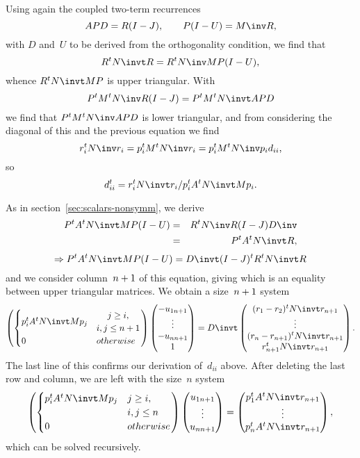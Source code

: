\documentclass[11pt]{artikel3}
\begin{document}
\begin{Outline}
Using again the coupled two-term recurrences 
\[ APD=R(I-J),\qquad P(I-U)=M\inv R,\]
with $D$ and~$U$ to be derived from the orthogonality condition,
we find that
\[ R^tN\invt R=R^tN\inv MP(I-U), \]
whence $R^tN\invt MP$ is upper triangular.
With
\[ P^tM^tN\inv R(I-J)=P^tM^tN\invt APD \]
we find that $P^tM^tN\inv APD$ is lower triangular,
and from considering the diagonal of this and the previous equation we find
\[ r_i^tN\inv r_i=p_i^tM^tN\inv r_i=p_i^tM^tN\inv p_id_{ii}, \]
so \[ d_{ii}^t=r_i^tN\invt r_i/p_i^tA^tN\invt Mp_i. \]

As in section~\ref{sec:scalars-nonsymm}, we derive
\begin{eqnarray*} P^tA^tN\invt MP(I-U)&=&
        R^tN\inv R(I-J)D\inv\\
        &=&P^tA^tN\invt R,\end{eqnarray*}
\[ \Rightarrow P^tA^tN\invt MP(I-U)=D\invt (I-J)^tR^tN\invt R \]
and we consider column~$n+\nobreak1$ of this equation, giving
which is an equality between upper triangular matrices.
We obtain a size~$n+\nobreak1$ system
\[ \begin{pmatrix}\begin{cases}p_i^tA^tN\invt Mp_j
                &\begin{matrix}j\geq i,\cr i,j\leq n+1\end{matrix}\cr
                   0&otherwise\end{cases}\end{pmatrix}
    \begin{pmatrix}-u_{1n+1}\cr \vdots\cr -u_{nn+1}\cr 1\end{pmatrix} = 
    D\invt \begin{pmatrix}(r_1-r_2)^tN\invt r_{n+1}\cr \vdots\cr
                (r_n-r_{n+1})^tN\invt r_{n+1}\cr r_{n+1}^tN\invt r_{n+1}\end{pmatrix}. \]
The last line of this confirms our derivation of~$d_{ii}$ above.
After deleting the last row and column, we are left with the size~$n$ system
\[ \begin{pmatrix}\begin{cases}p_i^tA^tN\invt Mp_j&j\geq i,\cr
                                     &i,j\leq n\cr 0&otherwise\end{cases}\end{pmatrix}
    \begin{pmatrix}u_{1n+1}\cr \vdots\cr u_{nn+1}\end{pmatrix} = 
    \begin{pmatrix}p_1^tA^tN\invt r_{n+1}\cr\vdots\cr p_n^tA^tN\invt r_{n+1}\end{pmatrix}, \]
which can be solved recursively.


\end{Outline}
\end{document}
